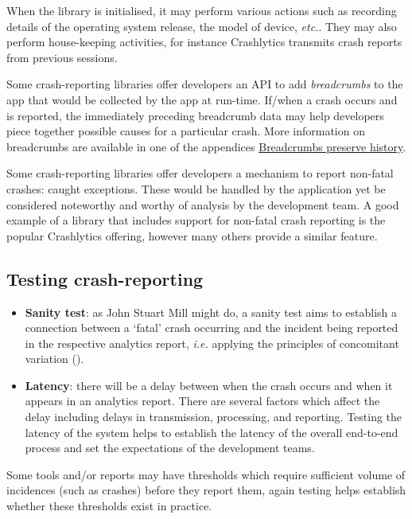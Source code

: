 When the library is initialised, it may perform various actions such as recording details of the operating system release, the model of device, \emph{etc.}. They may also perform house-keeping activities, for instance Crashlytics transmits crash reports from previous sessions.

\label{breadcrumb-feature}
Some crash-reporting libraries offer developers an API to add \emph{breadcrumbs} to the app that would be collected by the app at run-time. If/when a crash occurs and is reported, the immediately preceding breadcrumb data may help developers piece together possible causes for a particular crash. More information on breadcrumbs are available in one of the appendices \href{breadcrumbs-preserve-history}{Breadcrumbs preserve history}.

\label{error-reporting-feature}
Some crash-reporting libraries offer developers a mechanism to report non-fatal crashes: caught exceptions. These would be handled by the application yet be considered noteworthy and worthy of analysis by the development team. A good example of a library that includes support for non-fatal crash reporting is the popular Crashlytics offering, however many others provide a similar feature.  

\subsection{Testing crash-reporting}
\begin{itemize}
    \item \textbf{Sanity test}: as John Stuart Mill might do, a sanity test aims to establish a connection between a `fatal' crash occurring and the incident being reported in the respective analytics report, \emph{i.e.} applying the principles of concomitant variation (\cite{mill1884system}).
    \item \textbf{Latency}: there will be a delay between when the crash occurs and when it appears in an analytics report. There are several factors which affect the delay including delays in transmission, processing, and reporting. Testing the latency of the system helps to establish the latency of the overall end-to-end process and set the expectations of the development teams.
\end{itemize}

Some tools and/or reports may have thresholds which require sufficient volume of incidences (such as crashes) before they report them, again testing helps establish whether these thresholds exist in practice.

